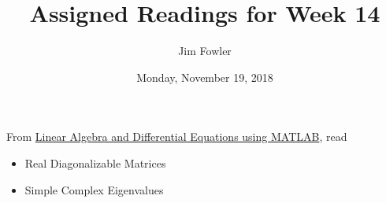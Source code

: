 \documentclass{homework}
\author{Jim Fowler}
\title{Assigned Readings for Week 14}
\date{Monday, November 19, 2018}
\begin{document}
\maketitle

From \href{/courses/43735/files/folder/textbooks}{Linear Algebra and Differential Equations using MATLAB}, read 
\begin{itemize}
\item {} Real Diagonalizable Matrices
\item {} Simple Complex Eigenvalues
\end{itemize}
\end{document}
